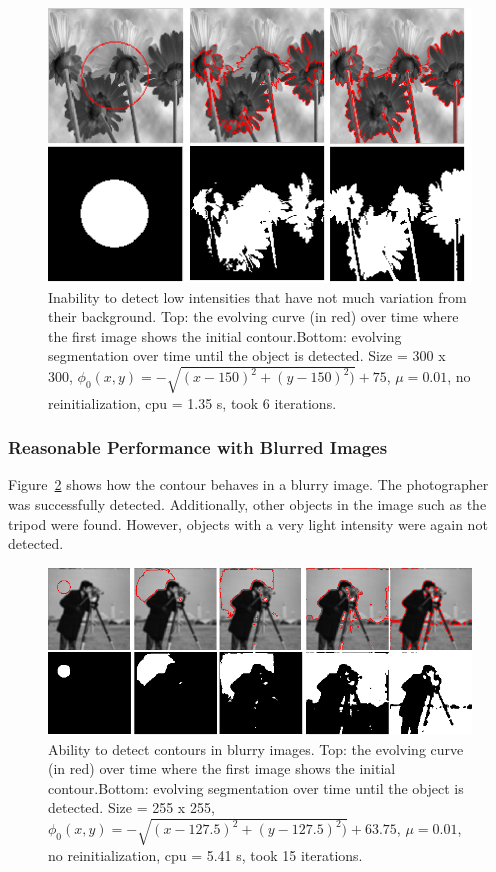 \documentclass[10pt,journal,letterpaper,compsoc]{IEEEtran}
\begin{document}
\begin{figure}[t]
\centering
\includegraphics[width=12cm]{cv_eg7.png}
\caption{Inability to detect low intensities that have not much variation from their background.  Top: the evolving curve (in red) over time where the first
image shows the initial
contour.Bottom: evolving segmentation over time until the object is detected. Size = 300 x 300, $\phi_{0}(x,y) = - \sqrt{(x - 150)^2 + (y - 150)^2)} + 75$,
$\mu =0.01$, no reinitialization, cpu = 1.35 s, took 6 iterations.}
\label{fig:cv_eg7}
\end{figure}

\subsubsection*{Reasonable Performance with Blurred Images}

Figure~\ref{fig:cv_eg9} shows how the contour behaves in a blurry image. The photographer was successfully detected. Additionally, other objects in the image
such as the tripod were found. However, objects with a very light intensity were again not detected.

\begin{figure}[t]
\centering
\includegraphics[width=12cm]{cv_eg9.png}
\caption{Ability to detect contours in blurry images.  Top: the evolving curve (in red) over time where the first
image shows the initial
contour.Bottom: evolving segmentation over time until the object is detected. Size = 255 x 255, $\phi_{0}(x,y) = - \sqrt{(x - 127.5)^2 + (y - 127.5)^2)} +
63.75$, $\mu =0.01$, no reinitialization, cpu = 5.41 s, took 15 iterations.}
\label{fig:cv_eg9}
\end{figure}
\end{document}
